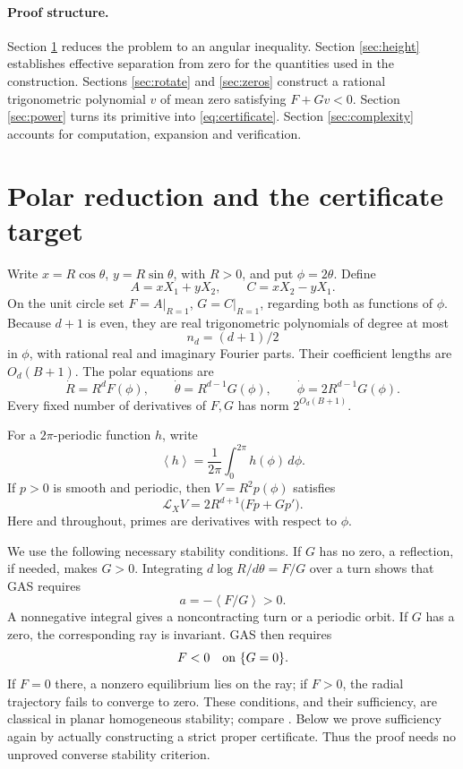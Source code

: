 \documentclass[11pt]{article}
\theoremstyle{remark}\newtheorem{remark}[theorem]{Remark}
\newcommand{\mean}[1]{\left\langle #1\right\rangle}
\newcommand{\LX}{\mathcal L_X}
\newcommand{\se}{2^{O_d(B+1)}}
\begin{document}
\paragraph{Proof structure.}
Section \ref{sec:polar} reduces the problem to an angular inequality.
Section \ref{sec:height} establishes effective separation from zero for the quantities used in the construction.
Sections \ref{sec:rotate} and \ref{sec:zeros} construct a rational trigonometric polynomial \(v\) of mean zero satisfying \(F+Gv<0\).
Section \ref{sec:power} turns its primitive into \eqref{eq:certificate}.
Section \ref{sec:complexity} accounts for computation, expansion and verification.

\section{Polar reduction and the certificate target}\label{sec:polar}

Write \(x=R\cos\theta\), \(y=R\sin\theta\), with \(R>0\), and put \(\phi=2\theta\).
Define
\[
 A=xX_1+yX_2,\qquad C=xX_2-yX_1.
\]
On the unit circle set \(F=A|_{R=1}\), \(G=C|_{R=1}\), regarding both as functions of \(\phi\).
Because \(d+1\) is even, they are real trigonometric polynomials of degree at most
\[
                         n_d=(d+1)/2
\]
in \(\phi\), with rational real and imaginary Fourier parts. Their coefficient lengths are \(O_d(B+1)\).
The polar equations are
\begin{equation}\label{eq:polar}
 \dot R=R^dF(\phi),\qquad
 \dot\theta=R^{d-1}G(\phi),\qquad
 \dot\phi=2R^{d-1}G(\phi).
\end{equation}
Every fixed number of derivatives of \(F,G\) has norm \(\se\).

For a \(2\pi\)-periodic function \(h\), write
\[
 \mean h=\frac1{2\pi}\int_0^{2\pi}h(\phi)\,d\phi.
\]
If \(p>0\) is smooth and periodic, then \(V=R^2p(\phi)\) satisfies
\begin{equation}\label{eq:lie}
 \LX V=2R^{d+1}\bigl(Fp+Gp'\bigr).
\end{equation}
Here and throughout, primes are derivatives with respect to \(\phi\).

We use the following necessary stability conditions. If \(G\) has no zero, a reflection, if needed, makes \(G>0\). Integrating \(d\log R/d\theta=F/G\) over a turn shows that GAS requires
\begin{equation}\label{eq:rotcriterion}
                         a=-\mean{F/G}>0.
\end{equation}
A nonnegative integral gives a noncontracting turn or a periodic orbit. If \(G\) has a zero, the corresponding ray is invariant. GAS then requires
\begin{equation}\label{eq:zerocriterion}
                         F<0\quad\hbox{on }\{G=0\}.
\end{equation}
If \(F=0\) there, a nonzero equilibrium lies on the ray; if \(F>0\), the radial trajectory fails to converge to zero. These conditions, and their sufficiency, are classical in planar homogeneous stability; compare \cite[Corollary 21.2]{KordaSupp}. Below we prove sufficiency again by actually constructing a strict proper certificate. Thus the proof needs no unproved converse stability criterion.
\end{document}
